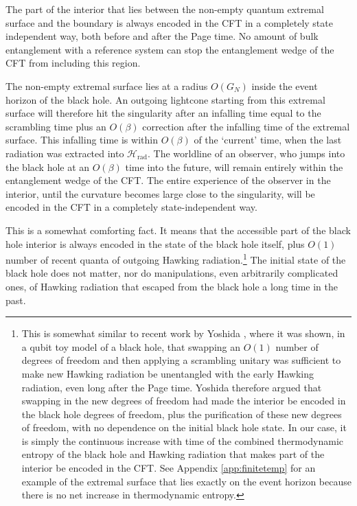 \documentclass[11pt,a4paper]{article}
\begin{document}
The part of the interior that lies between the non-empty quantum extremal surface and the boundary is always encoded in the CFT in a completely state independent way, both before and after the Page time. No amount of bulk entanglement with a reference system can stop the entanglement wedge of the CFT from including this region.

The non-empty extremal surface lies at a radius $O(G_N)$ inside the event horizon of the black hole. An outgoing lightcone starting from this extremal surface will therefore hit the singularity after an infalling time equal to the scrambling time plus an $O(\beta)$ correction after the infalling time of the extremal surface. This infalling time is within $O(\beta)$ of the `current' time, when the last radiation was extracted into $\mathcal{H}_\text{rad}$. The worldline of an observer, who jumps into the black hole at an $O(\beta)$ time into the future,  will remain entirely within the entanglement wedge of the CFT. The entire experience of the observer in the interior, until the curvature becomes large close to the singularity, will be encoded in the CFT in a completely state-independent way.

This is a somewhat comforting fact. It means that the accessible part of the black hole interior is always encoded in the state of the black hole itself, plus $O(1)$ number of recent quanta of outgoing Hawking radiation.\footnote{This is somewhat similar to recent work by Yoshida \cite{yoshida2019firewalls}, where it was shown,  in a qubit toy model of a black hole, that swapping an $O(1)$ number of degrees of freedom and then applying a scrambling unitary was sufficient to make new Hawking radiation be unentangled with the early Hawking radiation, even long after the Page time. Yoshida therefore argued that swapping in the new degrees of freedom had made the interior be encoded in the black hole degrees of freedom, plus the purification of these new degrees of freedom, with no dependence on the initial black hole state. In our case, it is simply the continuous increase with time of the combined thermodynamic entropy of the black hole and Hawking radiation that makes part of the interior be encoded in the CFT. See Appendix \ref{app:finitetemp} for an example of the extremal surface that lies exactly on the event horizon because there is no net increase in thermodynamic entropy.} The initial state of the black hole does not matter, nor do manipulations, even arbitrarily complicated ones, of Hawking radiation that escaped from the black hole a long time in the past.
\end{document}
